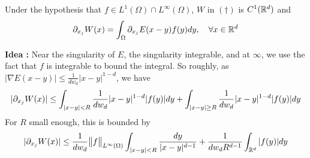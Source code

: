 \documentclass[12pt,a4paper]{article}
\newenvironment{proof}
{\begin{changemargin}{0.5cm}{0.5cm} 
	}%
	{\end{changemargin}
}
\newenvironment{p}
{\begin{proof} 
	}%
	{\end{proof}
}
\begin{document}
 Under the hypothesis that $f\in L^1(\Omega) \cap L^{\infty}(\Omega)$, $W$ in $(\dagger)$ is $C^1(\mathbb{R}^d)$ and
\begin{align*}
\partial_{x_j} W(x) = \int_{\Omega} \partial_{x_j} E(x-y) f(y) dy, \quad \forall x\in \mathbb{R}^d
\end{align*}
\begin{p}
\textbf{Idea :} Near the singularity of $E$, the singularity integrable, and at $\infty$, we use the fact that $f$ is integrable to bound the integral. So roughly, as $|\nabla E(x-y)| \leq \frac{1}{dw_d} |x-y|^{1-d}$, we have
\begin{align*}
|\partial_{x_j} W(x)| \leq \int_{|x-y|<R} \frac{1}{dw_d} |x-y|^{1-d} |f(y)| dy + \int_{|x-y|\geq R} \frac{1}{dw_d} |x-y|^{1-d} |f(y)|dy
\end{align*}
For $R$ small enough, this is bounded by
\begin{align*}
|\partial_{x_j} W(x)| \leq \frac{1}{dw_d} \bigl\lVert f\bigr\rVert_{L^{\infty}(\Omega)} \int_{|x-y|< R} \frac{dy}{|x-y|^{d-1}} + \frac{1}{dw_d R^{d-1}} \int_{\mathbb{R}^{d}} |f(y)| dy
\end{align*}



\end{p}
\end{document}
